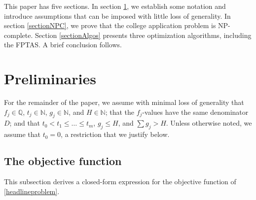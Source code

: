 \documentclass[11pt]{article} %
\theoremstyle{definition}
\begin{document}
This paper has five sections. In section \ref{sectionPrelims}, we establish some notation and introduce assumptions that can be imposed with little loss of generality. In section \ref{sectionNPC}, we prove that the college application problem is NP-complete. Section \ref{sectionAlgos} presents three optimization algorithms, including the FPTAS. A brief conclusion follows.

\section{Preliminaries} \label{sectionPrelims}

For the remainder of the paper, we assume with minimal loss of generality that $f_j \in \mathbb{Q}$, $t_j \in \mathbb{N}$, $g_j \in \mathbb{N}$, and $H \in \mathbb{N}$; that the $f_j$-values have the same denominator $D$; and that $t_0 < t_1 \leq \dots \leq t_m$, $g_j \leq H$, and $\sum g_j > H$. Unless otherwise noted, we assume that $t_0 = 0$, a restriction that we justify below.

\subsection{The objective function} \label{sectionObjective}

This subsection derives a closed-form expression for the objective function of \eqref{headlineproblem}.
\end{document}
